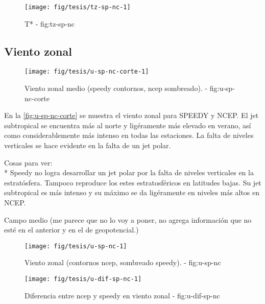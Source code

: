 \documentclass[spanish,a4paper]{book}
\begin{document}
\begin{figure*}
\texttt{[image: fig/tesis/tz-sp-nc-1]} \caption{T* - fig:tz-sp-nc}\label{fig:tz-sp-nc}
\end{figure*}

\subsection{Viento zonal}\label{viento-zonal-1}

\begin{figure}

{\centering \texttt{[image: fig/tesis/u-sp-nc-corte-1]} 

}

\caption{Viento zonal medio (speedy contornos, ncep sombreado). - fig:u-sp-nc-corte}\label{fig:u-sp-nc-corte}
\end{figure}

En la \autoref{fig:u-sp-nc-corte} se muestra el viento zonal para SPEEDY
y NCEP. El jet subtropical se encuentra más al norte y ligéramente más
elevado en verano, así como considerablemente más intenso en todas las
estaciones. La falta de niveles verticales se hace evidente en la falta
de un jet polar.


Cosas para ver:\\
* Speedy no logra desarrollar un jet polar por la falta de niveles
verticales en la estratósfera. Tampoco reproduce los estes
estratosféricos en latitudes bajas. Su jet subtropical es más intenso y
su máximo se da ligéramente en niveles más altos en NCEP.

Campo medio (me parece que no lo voy a poner, no agrega información que
no esté en el anterior y en el de geopotencial.)

\begin{landscape}\begin{figure}

{\centering \texttt{[image: fig/tesis/u-sp-nc-1]} 

}

\caption{Viento zonal (contornos ncep, sombreado speedy). - fig:u-sp-nc}\label{fig:u-sp-nc}
\end{figure}
\end{landscape}

\begin{figure*}
\texttt{[image: fig/tesis/u-dif-sp-nc-1]} \caption{Diferencia entre ncep y speedy en viento zonal - fig:u-dif-sp-nc}\label{fig:u-dif-sp-nc}
\end{figure*}
\end{document}

